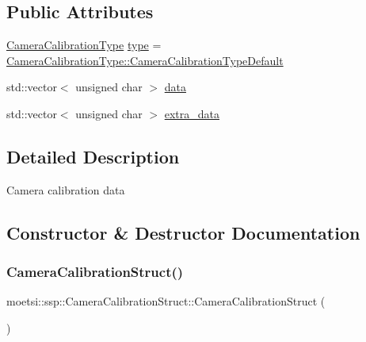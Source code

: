 \subsection*{Public Attributes}
\begin{DoxyCompactItemize}
\item 
\hyperlink{namespacemoetsi_1_1ssp_a1f51291db51233dc5865d42e6ee36ef8}{Camera\+Calibration\+Type} \hyperlink{structmoetsi_1_1ssp_1_1CameraCalibrationStruct_a1ca6c9353a0523a437fe2318d560f39a}{type} = \hyperlink{namespacemoetsi_1_1ssp_a1f51291db51233dc5865d42e6ee36ef8ac32f0bb1b309dd3992d8e37bfaa00c78}{Camera\+Calibration\+Type\+::\+Camera\+Calibration\+Type\+Default}
\item 
std\+::vector$<$ unsigned char $>$ \hyperlink{structmoetsi_1_1ssp_1_1CameraCalibrationStruct_a1e0d53a3a1f78729f4b4eb4d979a8a2d}{data}
\item 
std\+::vector$<$ unsigned char $>$ \hyperlink{structmoetsi_1_1ssp_1_1CameraCalibrationStruct_aba76ffbffe0ba568444a7473f6d081d2}{extra\+\_\+data}
\end{DoxyCompactItemize}


\subsection{Detailed Description}
Camera calibration data 

\subsection{Constructor \& Destructor Documentation}
\mbox{\label{structmoetsi_1_1ssp_1_1CameraCalibrationStruct_a5571f80a7f6136c795fde444eef1d015}} 
\subsubsection{\texorpdfstring{Camera\+Calibration\+Struct()}{CameraCalibrationStruct()}\hspace{0.1cm}{\footnotesize\ttfamily [1/4]}}
{\footnotesize\ttfamily moetsi\+::ssp\+::\+Camera\+Calibration\+Struct\+::\+Camera\+Calibration\+Struct (\begin{DoxyParamCaption}{ }\end{DoxyParamCaption})\hspace{0.3cm}{\ttfamily [inline]}}

